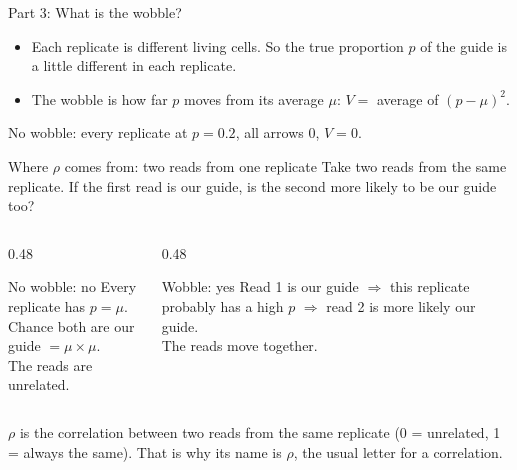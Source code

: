 \documentclass[aspectratio=169,11pt]{beamer}
\begin{document}
\begin{frame}{Part 3: What is the wobble?}
\begin{itemize}\small
\item Each replicate is different living cells. So the \alert{true
  proportion} $p$ of the guide is a little different in each replicate.
\item The \alert{wobble} is how far $p$ moves from its average $\mu$:
  \quad $V = $ average of $(p - \mu)^2$.
\end{itemize}
\begin{center}
\resizebox{!}{0.46\textheight}{}
\end{center}
{\small No wobble: every replicate at $p = 0.2$, all arrows 0, $V = 0$.}
\end{frame}

\begin{frame}{Where $\rho$ comes from: two reads from one replicate}
Take two reads from the same replicate. \alert{If the first read is our
guide, is the second more likely to be our guide too?}
\medskip
\begin{columns}[T]
\begin{column}{0.48\textwidth}
\begin{block}{No wobble: no}
Every replicate has $p = \mu$.\\
Chance both are our guide $= \mu \times \mu$.\\
The reads are unrelated.
\end{block}
\end{column}
\begin{column}{0.48\textwidth}
\begin{block}{Wobble: yes}
Read 1 is our guide $\Rightarrow$ this replicate probably has a high $p$
$\Rightarrow$ read 2 is more likely our guide.\\
The reads \alert{move together}.
\end{block}
\end{column}
\end{columns}
\medskip
\begin{remember}
$\rho$ is the \alert{correlation} between two reads from the same replicate
(0 = unrelated, 1 = always the same). That is why its name is $\rho$, the
usual letter for a correlation.
\end{remember}
\end{frame}
\end{document}
